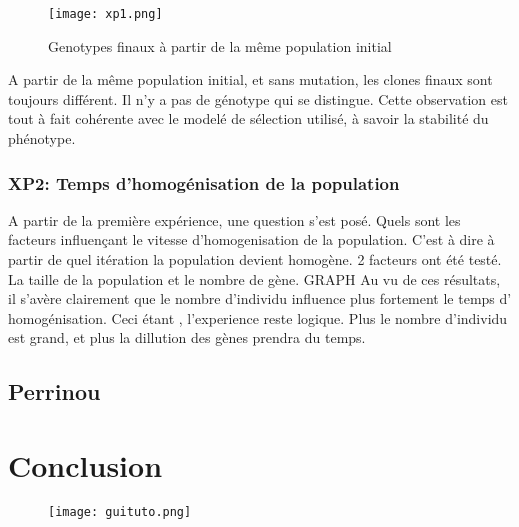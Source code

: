 \documentclass{article}
\begin{document}
	\begin{figure}[h]
	\label{xp1}
	\caption[test]{Genotypes finaux à partir de la même population initial}
	\centering
	\texttt{[image: xp1.png]}
	\end{figure}
	A partir de la même population initial, et sans mutation, les clones finaux sont toujours différent. Il n'y a pas de génotype qui se distingue. Cette observation est tout à fait cohérente avec le modelé de sélection utilisé, à savoir la stabilité du phénotype. 

	\subsubsection{XP2: Temps d'homogénisation de la population}
	A partir de la première expérience, une question s'est posé. Quels sont les facteurs influençant le vitesse d'homogenisation de la population. C'est à dire à partir de quel itération la population devient homogène. 
	2 facteurs ont été testé. La taille de la population et le nombre de gène.
	{GRAPH}
	Au vu de ces résultats, il s'avère clairement que le nombre d’individu influence plus fortement le temps d' homogénisation. Ceci étant , l'experience reste logique. Plus le nombre d'individu est grand, et plus la dillution des gènes prendra du temps. 



	\subsection{Perrinou}


	\section {Conclusion}

		\begin{figure}[p]
	\label{figure3}
	\vspace*{-3cm}
	\caption[test]{}
	\texttt{[image: guituto.png]}
	\end{figure}
	
\end{document}
